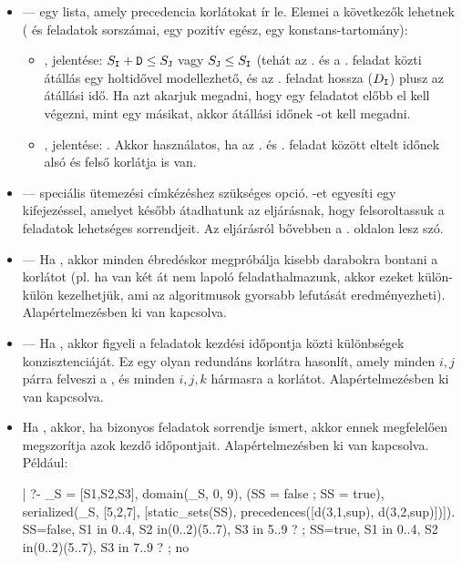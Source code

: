 \begin{itemize}
\item {} ---
           egy lista, amely precedencia korlátokat ír le. Elemei a következők
          lehetnek ( és  feladatok sorszámai,  egy pozitív
          egész,  egy  konstans-tartomány):
\begin{itemize}
\item{}, jelentése: $S_{\texttt{I}}+\texttt{D} \leq S_{\texttt{J}}$ vagy $S_{\texttt{J}} \leq S_{\texttt{I}}$
(tehát az . és a . feladat közti átállás egy holtidővel modellezhető, és
 az . feladat hossza ($D_{\texttt{I}}$) plusz az átállási idő. Ha azt akarjuk
megadni, hogy egy feladatot előbb el kell végezni, mint egy másikat, akkor átállási
időnek -ot kell megadni.
\item{}, jelentése: . Akkor használatos, ha az . és . feladat között
eltelt időnek alsó és felső korlátja is van.
\end{itemize}

\item {} --- speciális ütemezési címkézéshez szükséges opció. -et
          egyesíti egy kifejezéssel, amelyet később átadhatunk az 
          eljárásnak, hogy felsoroltassuk a feladatok lehetséges sorrendjeit. Az
           eljárásról bővebben a \pageref{order_resource}. oldalon
          lesz szó.

\item {} ---
          Ha  , akkor minden ébredéskor megpróbálja
          kisebb darabokra bontani a korlátot (pl. ha van két
          át nem lapoló feladathalmazunk, akkor ezeket külön-külön
          kezelhetjük, ami az algoritmusok gyorsabb lefutását
          eredményezheti). Alapértelmezésben ki van kapcsolva.

\item {} ---
          Ha  , akkor figyeli a feladatok kezdési
          időpontja közti különbségek konzisztenciáját. Ez egy olyan redundáns
          korlátra hasonlít, amely minden $i,j$ párra felveszi a
          , és minden $i,j,k$ hármasra a
           korlátot. Alapértelmezésben
          ki van kapcsolva.

\item {}
          Ha  , akkor, ha bizonyos feladatok sorrendje
          ismert, akkor ennek megfelelően megszorítja azok kezdő
          időpontjait. Alapértelmezésben ki van kapcsolva. Például:
\begin{prologcode}
| ?- _S = [S1,S2,S3],  domain(_S, 0, 9), (SS = false ; SS = true),
     serialized(_S, [5,2,7], [static_sets(SS),
                              precedences([d(3,1,sup), d(3,2,sup)])]).
SS=false, S1 in 0..4, S2 in(0..2)\/(5..7), S3 in 5..9 ? ;
SS=true,  S1 in 0..4, S2 in(0..2)\/(5..7), S3 in 7..9 ? ;
no
\end{prologcode}


\end{itemize}
